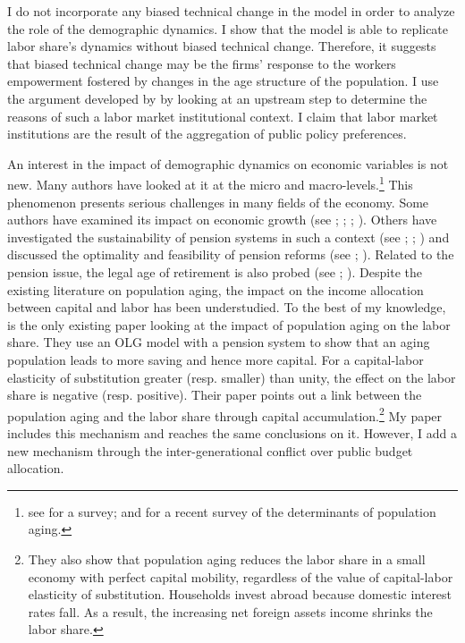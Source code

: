I do not incorporate any biased technical change in the model in order to analyze the role of the demographic dynamics. I show that the model is able to replicate labor share's dynamics without biased technical change. Therefore, it suggests that biased technical change may be the firms' response to the workers empowerment fostered by changes in the age structure of the population. I use the argument developed by \cite{Caballero1998} by looking at an upstream step to determine the reasons of such a labor market institutional context. I claim that labor market institutions are the result of the aggregation of public policy preferences.

An interest in the impact of demographic dynamics on economic variables is not new. Many authors have looked at it at the micro and macro-levels.\footnote{see \cite{Clark1978} for a survey; and \cite{Bloom2016} for a recent survey of the determinants of population aging.} 
This phenomenon presents serious challenges in many fields of the economy. Some authors have examined its impact on economic growth (see \citealt{VanGroezen2005}; \citealt{Soares2005}; \citealt{Bloom2010}; \citealt{Lee2010}). Others have investigated the sustainability of pension systems in such a context (see \citealt{Ono2003}; \citealt{DelaCroix2013}; \citealt{Philipov2014}) and discussed the optimality and feasibility of pension reforms (see \citealt{Pecchenino1997}; \citealt{Sinn2003}). Related to the pension issue, the legal age of retirement is also probed (see \citealt{Futagami2001}; \citealt{Dedry2017}). Despite the existing literature on population aging, the impact on the income allocation between capital and labor has been understudied. To the best of my knowledge, \cite{Schmidt2013} is the only existing paper looking at the impact of population aging on the labor share. They use an OLG model with a pension system to show that an aging population leads to more saving and hence more capital. For a capital-labor elasticity of substitution greater (resp. smaller) than unity, the effect on the labor share is negative (resp. positive). Their paper points out a link between the population aging and the labor share through capital accumulation.\footnote{They also show that population aging reduces the labor share in a small economy with perfect capital mobility, regardless of the value of capital-labor elasticity of substitution. Households invest abroad because domestic interest rates fall. As a result, the increasing net foreign assets income shrinks the labor share.} My paper includes this mechanism and reaches the same conclusions on it. However, I add a new mechanism through the inter-generational conflict over public budget allocation.

